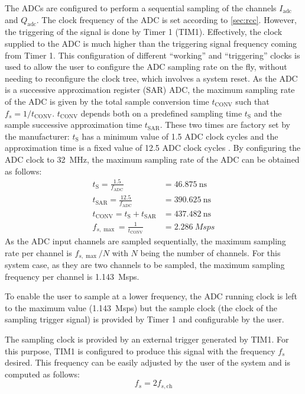 The ADCs are configured to perform a sequential sampling of the channels $I_{\mathrm{adc}}$ and $Q_{\mathrm{adc}}$. The clock frequency of the ADC is set according to \cref{sec:rcc}. However, the triggering of the signal is done by Timer 1 (TIM1). Effectively, the clock supplied to the ADC is much higher than the triggering signal frequency coming from Timer 1. This configuration of different ``working'' and ``triggering'' clocks is used to allow the user to configure the ADC sampling rate on the fly, without needing to reconfigure the clock tree, which involves a system reset. As the ADC is a successive approximation register (SAR) ADC, the maximum sampling rate of the ADC is given by the total sample conversion time $t_\mathrm{CONV}$ such that $f_s = 1/t_\mathrm{CONV}$. $t_\mathrm{CONV}$ depends both on a predefined sampling time $t_\mathrm{S}$ and the sample successive approximation time $t_\mathrm{SAR}$. These two times are factory set by the manufacturer: $t_\mathrm{S}$ has a minimum value of 1.5 ADC clock cycles and the approximation time is a fixed value of 12.5 ADC clock cycles \cite[p.~104]{STMicroelectronics2022}.
By configuring the ADC clock to \SI{32}{\mega\hertz}, the maximum sampling rate of the ADC can be obtained as follows:
\begin{align}
	t_\mathrm{S} = \frac{1.5}{f_\mathrm{ADC}} &= \SI{46.875}{\nano\second}\\
	t_\mathrm{SAR} = \frac{12.5}{f_\mathrm{ADC}}
	&= \SI{390.625}{\nano\second}\\
	t_\mathrm{CONV} = t_\mathrm{S} + t_\mathrm{SAR} &= \SI{437.482}{\nano\second}\\
	f_{s,\max} = \frac{1}{t_\mathrm{CONV}} &= \SI{2.286}{Msps}
\end{align}
As the ADC input channels are sampled sequentially, the maximum sampling rate per channel is $f_{s,\max}/N$ with $N$ being the number of channels. For this system case, as they are two channels to be sampled, the maximum sampling frequency per channel is \SI{1.143}{Msps}.

To enable the user to sample at a lower frequency, the ADC running clock is left to the maximum value (\SI{1.143}{Msps}) but the sample clock (the clock of the sampling trigger signal) is provided by Timer 1 and configurable by the user.

The sampling clock is provided by an external trigger generated by TIM1. For this purpose, TIM1 is configured to produce this signal with the frequency $f_{s}$ desired. This frequency can be easily adjusted by the user of the system and is computed as follows:
\begin{equation}
	f_s = 2 f_{s,\mathrm{ch}}
\end{equation}

